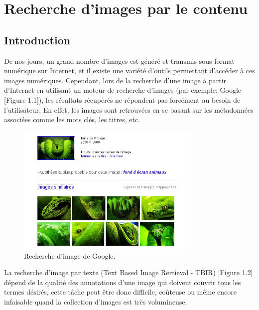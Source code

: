 
\chapter{Recherche d'images par le contenu} %




\section{Introduction}

	De nos jours, un grand nombre d'images est généré et transmis sous format numérique sur Internet, et il existe une variété d'outils permettant d'accéder à ces images numériques. Cependant, lors de la recherche d'une image à partir d'Internet en utilisant un moteur de recherche d'images (par exemple: Google [Figure 1.1]), les résultats récupérés ne répondent pas forcément au besoin de l'utilisateur. En effet, les images sont retrouvées en se basant sur les métadonnées associées comme les mots clés, les titres, etc.
	
	
\begin{figure}[H]
	\centering
		\includegraphics[width=3.5in]{Figures/googleImage2.png}
	\caption[An Electron]{Recherche d'image de Google.}
	\label{fig:Electron}
\end{figure}

	La recherche d'image par texte (Text Based Image Rertieval - TBIR) [Figure 1.2] dépend de la qualité des annotations d'une image qui doivent couvrir tous les termes désirés, cette tâche peut être donc difficile, coûteuse ou même encore infaisable quand la collection d'images est très volumineuse.
	
